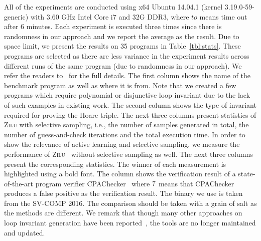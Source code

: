 All of the experiments are conducted using x64 Ubuntu 14.04.1 (kernel 3.19.0-59-generic) with 3.60 GHz Intel Core i7 and 32G DDR3, where $to$ means time out after 6 minutes. Each experiment is executed three times since there is randomness in our approach and we report the average as the result. Due to space limit, we present the results on 35 programs in Table~\ref{tbl:stats}. These programs are selected as there are less variance in the experiment results across different runs of the same program (due to randomness in our approach). We refer the readers to~\cite{zilu:repo} for the full details. The first column shows the name of the benchmark program as well as where it is from. Note that we created a few programs which require polynomial or disjunctive loop invariant due to the lack of such examples in existing work. The second column shows the type of invariant required for proving the Hoare triple. The next three columns present statistics of \textsc{Zilu} with selective sampling, i.e., the number of samples generated in total, the number of guess-and-check iterations and the total execution time. In order to show the relevance of active learning and selective sampling, we measure the performance of \textsc{Zilu}~\cite{zilu:repo} without selective sampling as well. The next three columns present the corresponding statistics. The winner of each measurement is highlighted using a bold font.
The column shows the verification result of a state-of-the-art program verifier CPAChecker~\cite{DBLP:conf/cav/BeyerK11} where $\ding{55}$ means that CPAChecker produces a false positive as the verification result. The binary we use is taken from the SV-COMP 2016. The comparison should be taken with a grain of salt as the methods are different.
 We remark that though many other approaches on loop invariant generation have been reported~\cite{sharma2012interpolants,sharma2013verification,DBLP:conf/esop/0001GHALN13,sharma2014invariant}, the tools are no longer maintained and updated. %

